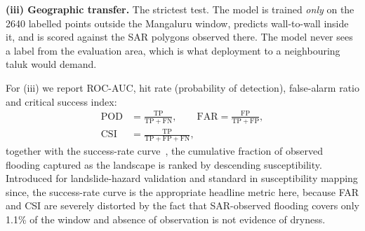 \documentclass[journal]{IEEEtran}
\begin{document}
\textbf{(iii) Geographic transfer.} The strictest test. The model is trained
\emph{only} on the \num{2640} labelled points outside the Mangaluru window,
predicts wall-to-wall inside it, and is scored against the SAR polygons observed
there. The model never sees a label from the evaluation area, which is what
deployment to a neighbouring taluk would demand.

For (iii) we report ROC-AUC, hit rate (probability of detection),
false-alarm ratio and critical success index:
\begin{equation}
\begin{aligned}
\mathrm{POD}&=\tfrac{\mathrm{TP}}{\mathrm{TP}+\mathrm{FN}}, \qquad
\mathrm{FAR}=\tfrac{\mathrm{FP}}{\mathrm{TP}+\mathrm{FP}}, \\[2pt]
\mathrm{CSI}&=\tfrac{\mathrm{TP}}{\mathrm{TP}+\mathrm{FP}+\mathrm{FN}},
\end{aligned}
\label{eq:contingency}
\end{equation}
together with the success-rate curve~\citep{chung2003}, the cumulative fraction
of observed flooding captured as the landscape is ranked by descending
susceptibility. Introduced for landslide-hazard validation and standard in
susceptibility mapping since, the success-rate curve is the appropriate headline
metric here, because FAR and CSI
are severely distorted by the fact that SAR-observed flooding covers only 1.1\%
of the window and absence of observation is not evidence of dryness.
\end{document}
